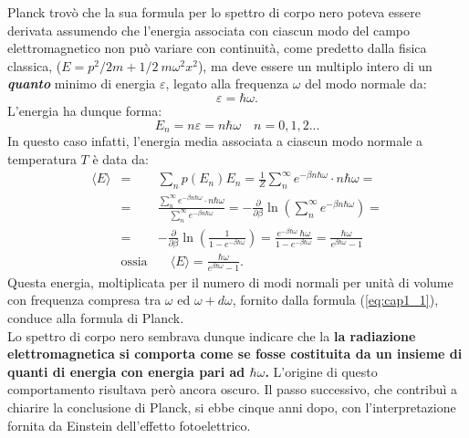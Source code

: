 Planck trovò che la sua formula  per lo spettro di corpo nero poteva essere derivata assumendo che l'energia associata con ciascun modo del campo elettromagnetico non può variare con continuità, come predetto dalla fisica classica, ($E= p^2/2m +1/2 \ m \omega ^2 x^2$), ma deve essere un multiplo intero di un \textbf{\textit{quanto}} minimo di energia $\varepsilon$, legato alla frequenza $\omega$ del modo normale da:
\begin{equation}
\varepsilon = \hbar \omega .
\end{equation}
L'energia ha dunque forma:
\begin{equation}
E_n = n\varepsilon = n \hbar \omega \quad n= 0,1,2...
\end{equation}
In questo caso infatti, l'energia media associata a ciascun modo normale a temperatura $T$ è data da:
\begin{eqnarray}
\langle E \rangle &=&\sum _n p(E_n) E_n =\frac{1}{Z}\sum _n ^{\infty} e^{-\beta n \hbar \omega} \cdot n\hbar \omega = \nonumber \\
&=&\frac{\sum _n ^{\infty} e^{-\beta n \hbar \omega} \cdot n\hbar \omega}{\sum _n ^{\infty} e^{-\beta n \hbar \omega}}= - \frac{\partial}{\partial \beta} \ln \left( \sum _n ^{\infty} e^{-\beta n \hbar \omega}\right)= \nonumber \\
&=&- \frac{\partial}{\partial \beta} \ln \left( \frac{1}{1- e^{-\beta \hbar \omega}}\right)=  \frac{e^{-\beta \hbar \omega}\ \hbar \omega}{1-e^{-\beta \hbar \omega}}= \frac{ \hbar \omega}{e^{\beta \hbar \omega}-1}\nonumber \\
&\textrm{ossia}& \quad \langle E \rangle = \frac{ \hbar \omega}{e^{\beta \hbar \omega}-1}.
\end{eqnarray}
Questa energia, moltiplicata per il numero di modi normali per unità di volume con frequenza compresa tra $\omega$ ed $\omega + d\omega$, fornito dalla formula (\ref{eq:cap1_1}), conduce alla formula di Planck.\\
Lo spettro di corpo nero sembrava dunque indicare che la \textbf{la radiazione elettromagnetica si comporta come se fosse costituita da un insieme di quanti di energia con energia pari ad $\hbar \omega $.}
L'origine di questo comportamento risultava però ancora oscuro. Il passo successivo, che contribuì a chiarire la conclusione di Planck, si ebbe cinque anni dopo, con l'interpretazione fornita da Einstein dell'effetto fotoelettrico.
